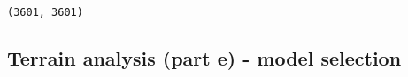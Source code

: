 \documentclass[11pt]{article}
\begin{document}
    \begin{center}
    \end{center}
    { \hspace*{\fill} \\}
    
    \begin{Verbatim}[commandchars=\\\{\}]
(3601, 3601)

    \end{Verbatim}

    \subsection{Terrain analysis (part e) - model
selection}\label{terrain-analysis-part-e---model-selection}
\end{document}
